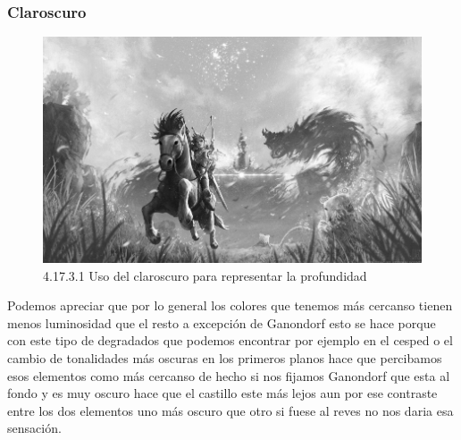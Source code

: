 \documentclass[12pt]{article}
\begin{document}
      \subsubsection{Claroscuro}

        
        \begin{figure}[H]
          \centering
          \includegraphics[scale=0.7]{images/Saúl/Sección 17/EA_img17_3Claroscuro_1Profundidad.png}
          \caption{\small 4.17.3.1 Uso del claroscuro para representar la profundidad}
        \end{figure}
        Podemos apreciar que por lo general los colores que tenemos más cercanso tienen menos luminosidad que el resto a excepción de Ganondorf esto se hace porque con este tipo de degradados que podemos encontrar por ejemplo en el cesped o el cambio de tonalidades más oscuras en los primeros planos hace que percibamos esos elementos como más cercanso de hecho si nos fijamos Ganondorf que esta al fondo y es muy oscuro hace que el castillo este más lejos aun por ese contraste entre los dos elementos uno más oscuro que otro si fuese al reves no nos daria esa sensación.
\end{document}

